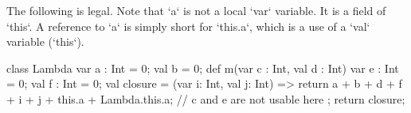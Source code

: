 \begin{eg}
 The following is legal.  
Note that \xcd`a` is not a local \xcd`var` variable. It is a field of
\xcd`this`. A reference to \xcd`a` is simply short for \xcd`this.a`, which is
a use of a \xcd`val` variable (\xcd`this`).  
\begin{xten}
class Lambda {
   var a : Int = 0;
   val b = 0;
   def m(var c : Int, val d : Int) {
      var e : Int = 0;
      val f : Int = 0;
      val closure = (var i: Int, val j: Int) => {
    	  return a + b + d + f + i 
               + j + this.a + Lambda.this.a;
          // c and e are not usable here
      };
      return closure;
   }
}
\end{xten}
%


% 
\begin{xten}
\end{xten}
%



\end{eg}

